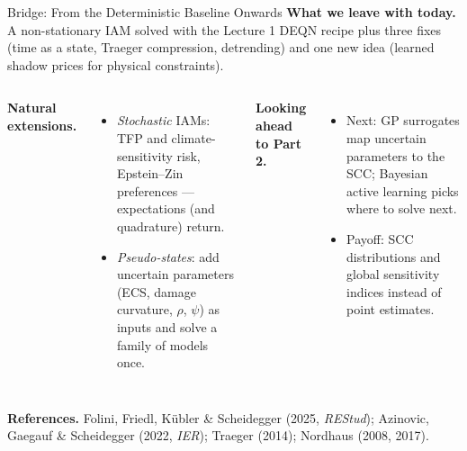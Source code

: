 \documentclass[aspectratio=169,11pt]{beamer}
\newcommand{\emphc}[1]{\textcolor{harvardcrimson}{#1}}
\begin{document}
\begin{frame}{Bridge: From the Deterministic Baseline Onwards}
\textbf{What we leave with today.} A non-stationary IAM solved with the Lecture 1 DEQN recipe plus three fixes (time as a state, Traeger compression, detrending) and one new idea (learned shadow prices for physical constraints).

\vspace{0.4em}
\begin{columns}[T]
\textbf{Natural extensions.}
\begin{itemize}
    \item \emph{Stochastic} IAMs: TFP and climate-sensitivity risk, Epstein--Zin preferences --- expectations (and quadrature) return.
    \item \emph{Pseudo-states}: add uncertain parameters (ECS, damage curvature, $\rho$, $\psi$) as inputs and solve a \emphc{family} of models once.
\end{itemize}

\textbf{Looking ahead to Part 2.}
\begin{itemize}
    \item Next: GP surrogates map uncertain parameters to the SCC; Bayesian active learning picks where to solve next.
    \item Payoff: SCC \emphc{distributions} and global sensitivity indices instead of point estimates.
\end{itemize}
\end{columns}

\vspace{0.5em}
{\small \textbf{References.} Folini, Friedl, K\"ubler \& Scheidegger (2025, \emph{REStud}); Azinovic, Gaegauf \& Scheidegger (2022, \emph{IER}); Traeger (2014); Nordhaus (2008, 2017).}
\end{frame}
\end{document}
